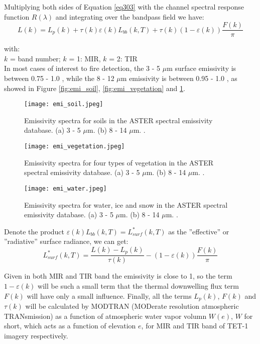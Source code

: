 \noindent Multiplying both sides of Equation \eqref{eq303} with the channel spectral response function $R(\lambda)$ and integrating over the bandpass field we have:
\begin{equation}
\label{eq304}
L(k) = L_p(k) + \tau (k) \varepsilon (k) L_{bb}(k, T) + \tau (k) (1 - \varepsilon (k)) \frac{F(k)}{\pi}
\end{equation}

\noindent with:\\
\indent $k$ = band number; $k$ = 1: MIR, $k$ = 2: TIR\\

\noindent In most cases of interest to fire detection, the 3 - 5 $\mu$m surface emissivity is between 0.75 - 1.0 \parencite{Reference301}, while the 8 - 12 $\mu$m emissivity is between 0.95 - 1.0 \parencite{Reference302}, as showed in Figure \ref{fig:emi_soil}, \ref{fig:emi_vegetation} and \ref{fig:emi_water}.\\

\begin{figure}[!htbp]
  \centering\texttt{[image: emi\_soil.jpeg]}
  \caption{Emissivity spectra for soils in the ASTER spectral emissivity database. (a) 3 - 5 $\mu$m. (b) 8 - 14 $\mu$m. \parencite{Reference303}.}
  \label{fig:emi_soil}
  
  \centering\texttt{[image: emi\_vegetation.jpeg]}
  \caption{Emissivity spectra for four types of vegetation in the ASTER spectral emissivity database. (a) 3 - 5 $\mu$m. (b) 8 - 14 $\mu$m. \parencite{Reference303}.}
  \label{fig:emi_vegetation}
  
  \centering\texttt{[image: emi\_water.jpeg]}
  \caption{Emissivity spectra for water, ice and snow in the ASTER spectral emissivity database. (a) 3 - 5 $\mu$m. (b) 8 - 14 $\mu$m. \parencite{Reference303}.}
  \label{fig:emi_water}
\end{figure}

\noindent Denote the product $\varepsilon(k) L_{bb}(k, T) = L_{surf}^*(k, T)$ as the ''effective'' or ''radiative'' surface radiance, we can get:
\begin{equation}
\label{eq305}
L_{surf}^*(k, T) = \frac{L(k) - L_p(k)}{\tau (k)} - (1 - \varepsilon (k)) \frac{F(k)}{\pi}
\end{equation}

\noindent Given in both MIR and TIR band the emissivity is close to 1, so the term $1 - \varepsilon (k)$ will be such a small term that the thermal downwelling flux term $F(k)$ will have only a small influence. Finally, all the terms $L_p(k)$, $F(k)$ and $\tau (k)$ will be calculated by MODTRAN (MODerate resolution atmospheric TRANsmission) as a function of atmospheric water vapor volumn $W(e)$, $W$ for short, which acts as a function of elevation $e$, for MIR and TIR band of TET-1 imagery respectively.\\

